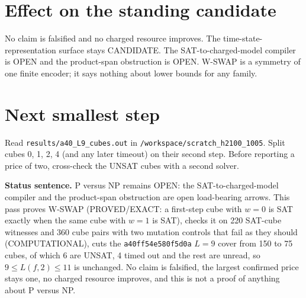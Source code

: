 \documentclass[11pt]{article}
\begin{document}
\section*{Effect on the standing candidate}
No claim is falsified and no charged resource improves. The time-state-representation surface stays CANDIDATE. The SAT-to-charged-model compiler is OPEN and the product-span obstruction is OPEN. W-SWAP is a symmetry of one finite encoder; it says nothing about lower bounds for any family.

\section*{Next smallest step}
Read \texttt{results/a40\_L9\_cubes.out} in \texttt{/workspace/scratch\_h2100\_1005}. Split cubes 0, 1, 2, 4 (and any later timeout) on their second step. Before reporting a price of two, cross-check the UNSAT cubes with a second solver.

\bigskip
\noindent\textbf{Status sentence.} P versus NP remains OPEN: the SAT-to-charged-model compiler and the product-span obstruction are open load-bearing arrows. This pass proves W-SWAP (PROVED/EXACT: a first-step cube with $w=0$ is SAT exactly when the same cube with $w=1$ is SAT), checks it on 220 SAT-cube witnesses and 360 cube pairs with two mutation controls that fail as they should (COMPUTATIONAL), cuts the \texttt{a40ff54e580f5d0a} $L=9$ cover from 150 to 75 cubes, of which 6 are UNSAT, 4 timed out and the rest are unread, so $9\le L(f,2)\le 11$ is unchanged. No claim is falsified, the largest confirmed price stays one, no charged resource improves, and this is not a proof of anything about P versus NP.
\end{document}
